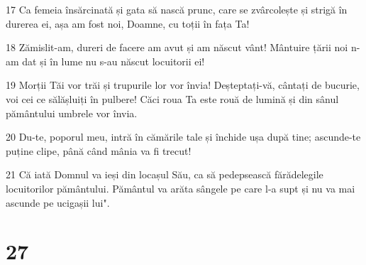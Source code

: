 \par 17 Ca femeia însărcinată și gata să nască prunc, care se zvârcolește și strigă în durerea ei, așa am fost noi, Doamne, cu toții în fața Ta!
\par 18 Zămislit-am, dureri de facere am avut și am născut vânt! Mântuire țării noi n-am dat și în lume nu s-au născut locuitorii ei!
\par 19 Morții Tăi vor trăi și trupurile lor vor învia! Deșteptați-vă, cântați de bucurie, voi cei ce sălășluiți în pulbere! Căci roua Ta este rouă de lumină și din sânul pământului umbrele vor învia.
\par 20 Du-te, poporul meu, intră în cămările tale și închide ușa după tine; ascunde-te puține clipe, până când mânia va fi trecut!
\par 21 Că iată Domnul va ieși din locașul Său, ca să pedepsească fărădelegile locuitorilor pământului. Pământul va arăta sângele pe care l-a supt și nu va mai ascunde pe ucigașii lui".

\chapter{27}

